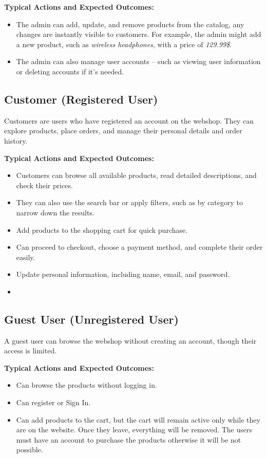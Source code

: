 \documentclass[12pt]{article}
\begin{document}
\textbf{Typical Actions and Expected Outcomes:}

\begin{itemize}
		\item The admin can add, update, and remove products from the catalog, any changes are instantly visible to customers.
		For example, the admin might add a new product, such as  \textit{wireless headphones}, with a price of \textit{129.99\$}.
		\item The admin can also manage user accounts – such as viewing user information or deleting accounts if it's needed.
\end{itemize}

\subsection*{Customer (Registered User)}

Customers are users who have registered an account on the webshop.
They can explore products, place orders, and manage their personal details and order history.

\textbf{Typical Actions and Expected Outcomes:}
	\begin{itemize}
  		\item Customers can browse all available products, read detailed descriptions, and check their prices.
		\item They can also use the search bar or apply filters, such as by category to narrow down the results.
		\item Add products to the shopping cart for quick purchase.
		\item Can proceed to checkout, choose a payment method, and complete their order easily.
		\item Update personal information, including name, email, and password.
\item \end{itemize}

\subsection*{Guest User (Unregistered User)}

A guest user can browse the webshop without creating an account, though their access is limited.

\textbf{Typical Actions and Expected Outcomes:}
\begin{itemize}
	\item Can browse the products without logging in.
	\item Can register or Sign In.
	\item Can add products to the cart, but the cart will remain active only while they are on the website.
	Once they leave, everything will be removed.
	The users must have an account to purchase the products otherwise it will be not possible.
\end{itemize}
\end{document}
